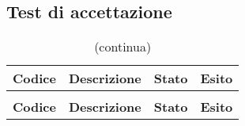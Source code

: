 \subsection{Test di accettazione} 
	\renewcommand{\arraystretch}{1.5}
	
	\begin{longtable}{ >{\centering}p{} >{}p{}
			>{\centering}p{} >{\centering}p{}}
			
		\caption{Riepilogo test di accettazione}\\	
		\rowcolorhead
		\textbf{\color{white}Codice} 
		& \centering\textbf{\color{white}Descrizione} 
		& \centering\textbf{\color{white}Stato}
		& \centering\textbf{\color{white}Esito} 
		\tabularnewline %
		\endfirsthead	
		
		\rowcolor{white}\caption[]{(continua)}\\	
		\rowcolorhead
		\textbf{\color{white}Codice} 
		& \centering\textbf{\centering\color{white}Descrizione} 
		& \centering\textbf{\color{white}Stato}
		& \centering\textbf{\color{white}Esito} 
		\tabularnewline %
		\endhead	
		

\end{longtable}
